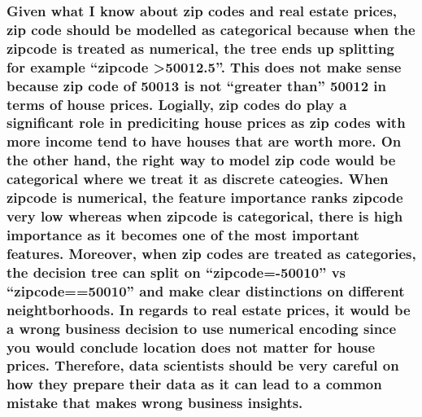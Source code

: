 \documentclass[
  letterpaper,
  DIV=11,
  numbers=noendperiod]{scrartcl}
\begin{document}
\subsubsection{Given what I know about zip codes and real estate prices,
zip code should be modelled as categorical because when the zipcode is
treated as numerical, the tree ends up splitting for example ``zipcode
\textgreater50012.5''. This does not make sense because zip code of
50013 is not ``greater than'' 50012 in terms of house prices. Logially,
zip codes do play a significant role in prediciting house prices as zip
codes with more income tend to have houses that are worth more. On the
other hand, the right way to model zip code would be categorical where
we treat it as discrete cateogies. When zipcode is numerical, the
feature importance ranks zipcode very low whereas when zipcode is
categorical, there is high importance as it becomes one of the most
important features. Moreover, when zip codes are treated as categories,
the decision tree can split on ``zipcode=-50010'' vs ``zipcode==50010''
and make clear distinctions on different neightborhoods. In regards to
real estate prices, it would be a wrong business decision to use
numerical encoding since you would conclude location does not matter for
house prices. Therefore, data scientists should be very careful on how
they prepare their data as it can lead to a common mistake that makes
wrong business
insights.}\label{given-what-i-know-about-zip-codes-and-real-estate-prices-zip-code-should-be-modelled-as-categorical-because-when-the-zipcode-is-treated-as-numerical-the-tree-ends-up-splitting-for-example-zipcode-50012.5.-this-does-not-make-sense-because-zip-code-of-50013-is-not-greater-than-50012-in-terms-of-house-prices.-logially-zip-codes-do-play-a-significant-role-in-prediciting-house-prices-as-zip-codes-with-more-income-tend-to-have-houses-that-are-worth-more.-on-the-other-hand-the-right-way-to-model-zip-code-would-be-categorical-where-we-treat-it-as-discrete-cateogies.-when-zipcode-is-numerical-the-feature-importance-ranks-zipcode-very-low-whereas-when-zipcode-is-categorical-there-is-high-importance-as-it-becomes-one-of-the-most-important-features.-moreover-when-zip-codes-are-treated-as-categories-the-decision-tree-can-split-on-zipcode-50010-vs-zipcode50010-and-make-clear-distinctions-on-different-neightborhoods.-in-regards-to-real-estate-prices-it-would-be-a-wrong-business-decision-to-use-numerical-encoding-since-you-would-conclude-location-does-not-matter-for-house-prices.-therefore-data-scientists-should-be-very-careful-on-how-they-prepare-their-data-as-it-can-lead-to-a-common-mistake-that-makes-wrong-business-insights.}
\end{document}

